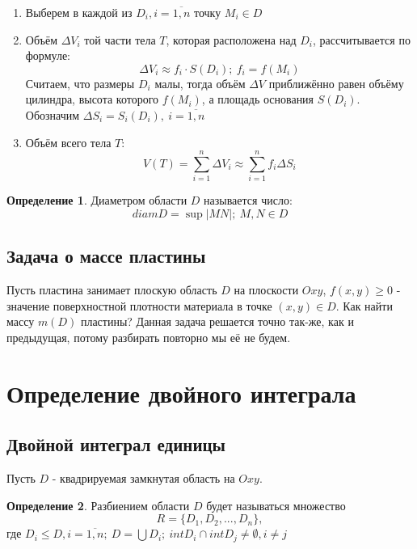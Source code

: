 \documentclass[a4paper, 14pt]{report}
\theoremstyle{definition}
\newtheorem*{definition}{Определение}
\begin{document}
\begin{enumerate}
				\item Выберем в каждой из $D_i, i=\overline{1,n}$ точку $M_i\in D$
				\item Объём $\Delta V_i$ той части тела $T$, которая расположена над $D_i$, рассчитывается по формуле:
					\begin{equation}
						\Delta V_i\approx f_i\cdot S(D_i); ~f_i=f(M_i)
					\end{equation}
					Считаем, что размеры $D_i$ малы, тогда объём $\Delta V$ приближённо равен объёму цилиндра, высота которого $f(M_i)$, а площадь основания $S(D_i)$. Обозначим $\Delta S_i=S_i(D_i), ~i=\overline{1,n}$

				\item Объём всего тела $T$:
					\begin{equation}
						V(T)=\sum_{i=1}^{n}\Delta V_i\approx\sum_{i=1}^{n}f_i\Delta S_i
					\end{equation}
			\end{enumerate}
		
			\begin{definition}
				Диаметром области $D$ называется число:
				\begin{equation}
					diamD=\sup|MN|; ~M,N\in D
				\end{equation}
			\end{definition}
		
		\subsection{Задача о массе пластины}
			Пусть пластина занимает плоскую область $D$ на плоскости $Oxy$, $f(x,y)\ge0$ - значение поверхностной плотности материала в точке $(x,y)\in D$. Как найти массу $m(D)$ пластины? Данная задача решается точно так-же, как и предыдущая, потому разбирать повторно мы её не будем.
	
	\section{Определение двойного интеграла}
		\subsection{Двойной интеграл единицы}
			Пусть $D$ - квадрируемая замкнутая область на $Oxy$.
			\begin{definition}
				Разбиением области $D$ будет называться множество
				\begin{equation}
					R=\{D_1,D_2,...,D_n\},
				\end{equation}
				где $D_i\le D, i=\overline{1,n};
				~D=\bigcup D_i;
				~intD_i\cap intD_j\ne\emptyset, i\ne j$
			\end{definition}
		
\end{document}

